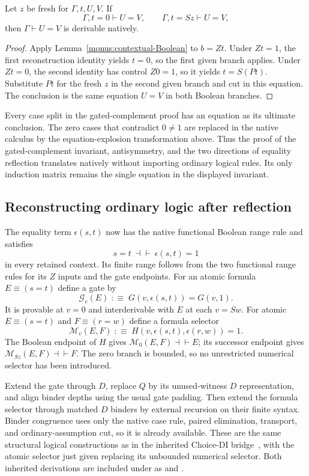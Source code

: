\begin{lemma}
\label{monus:contextual-numerical}
Let $z$ be fresh for $\Gamma,t,U,V$. If
\[
 \Gamma,t=0\vdash U=V,\qquad
 \Gamma,t=Sz\vdash U=V,
\]
then $\Gamma\vdash U=V$ is derivable natively.
\end{lemma}
\begin{proof}
Apply Lemma~\ref{monus:contextual-Boolean} to $b=Zt$.
Under $Zt=1$, the first reconstruction identity yields $t=0$,
so the first given branch applies. Under $Zt=0$, the second identity
has control $Z0=1$, so it yields $t=S(Pt)$. Substitute $Pt$ for the
fresh $z$ in the second given branch and cut in this equation.
The conclusion is the same equation $U=V$ in both Boolean branches.
\end{proof}

Every case split in the gated-complement proof has an equation as its
ultimate conclusion. The zero cases that contradict $0\ne1$ are
replaced in the native calculus by the equation-explosion transformation
above. Thus the proof of the gated-complement invariant, antisymmetry,
and the two directions of equality reflection translates natively
without importing ordinary logical rules. Its only induction matrix
remains the single equation in the displayed invariant.

\subsection{Reconstructing ordinary logic after reflection}
The equality term $\epsilon(s,t)$ now has the native functional Boolean
range rule and satisfies
\[
 s=t\ \dashv\vdash\ \epsilon(s,t)=1
\]
in every retained context. Its finite range follows from the two
functional range rules for its $Z$ inputs and the gate endpoints.
For an atomic formula $E\equiv(s=t)$ define a gate by
\[
 \mathcal G_v(E)\;:\equiv\;
        G(v,\epsilon(s,t))=G(v,1).
\]
It is provable at $v=0$ and interderivable with $E$ at each $v=Sw$.
For atomic $E\equiv(s=t)$ and $F\equiv(r=w)$ define a formula selector
\[
 \mathcal M_v(E,F)\;:\equiv\;
        H(v,\epsilon(s,t),\epsilon(r,w))=1.
\]
The Boolean endpoint of $H$ gives $\mathcal M_0(E,F)\dashv\vdash E$;
its successor endpoint gives $\mathcal M_{Sz}(E,F)\dashv\vdash F$.
The zero branch is bounded, so no unrestricted numerical selector has
been introduced.

Extend the gate through $D$, replace $Q$ by its unused-witness $D$
representation, and align binder depths using the usual gate padding.
Then extend the formula selector through matched $D$ binders by external
recursion on their finite syntax. Binder congruence uses only the native
case rule, paired elimination, transport, and ordinary-assumption cut,
so it is already available. These are the same structural logical
constructions as in the inherited Choice-DI bridge~\cite{certified}, with
the atomic selector just given replacing its unbounded numerical selector.
Both inherited derivations are included under
 as
 and
.

